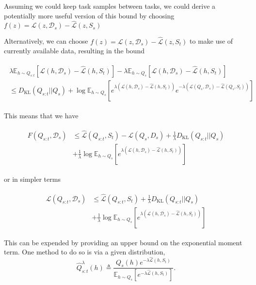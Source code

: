 \documentclass[letterpaper]{article}
\theoremstyle{definition}
\begin{document}
Assuming we could keep task samples between tasks, we could derive a potentially more useful version of this bound by choosing $f(z)=\mathcal{L}(z,\mathcal{D}_s)-\hat{\mathcal{L}}(z,S_s)$ %

Alternatively, we can choose $f(z)=\mathcal{L}(z,\mathcal{D}_s)-\hat{\mathcal{L}}(z,S_t)$ to make use of currently available data, resulting in the bound 


\begin{align*}
\begin{split}
\lambda\mathbb{E}_{h\sim Q_{s:t}}\left [\mathcal{L}(h,\mathcal{D}_s)-\hat{\mathcal{L}}(h,S_t) \right ] - \lambda\mathbb{E}_{h\sim Q_{s}}\left [\mathcal{L}(h,\mathcal{D}_s)-\hat{\mathcal{L}}(h,S_t) \right ] \\
\leq D_{\mathrm{KL}}(Q_{s:t}||Q_{s})+\log\mathbb{E}_{h\sim Q_{s}}\left [e^{\lambda(\mathcal{L}(h,\mathcal{D}_s)-\hat{\mathcal{L}}(h,S_t))}e^{-\lambda(\mathcal{L}(Q_s,\mathcal{D}_s)-\hat{\mathcal{L}}(Q_s,S_t))} \right ]
\end{split}
\end{align*}

This means that we have

\begin{align} \label{eq:forget-base}
\begin{split}
F(Q_{s:t},\mathcal{D}_s) &\leq \hat{\mathcal{L}}(Q_{s:t}, S_t) - \mathcal{L}(Q_{s}, D_s) + \frac{1}{\lambda} D_{\mathrm{KL}}(Q_{s:t}||Q_{s})\\
&+\frac{1}{\lambda}\log\mathbb{E}_{h\sim Q_{s}}\left [e^{\lambda(\mathcal{L}(h,\mathcal{D}_s)-\hat{\mathcal{L}}(h,S_t))} \right ]
\end{split}
\end{align}

or in simpler terms 

\begin{align} \label{eq:forget-base2}
\begin{split}
\mathcal{L}(Q_{s:t}, \mathcal{D}_s) &\leq \hat{\mathcal{L}}(Q_{s:t}, S_t) + \frac{1}{\lambda} D_{\mathrm{KL}}(Q_{s:t}||Q_{s})\\
&+\frac{1}{\lambda}\log\mathbb{E}_{h\sim Q_{s}}\left [e^{\lambda(\mathcal{L}(h,\mathcal{D}_s)-\hat{\mathcal{L}}(h,S_t))} \right ]
\end{split}
\end{align}

This can be expended by providing an upper bound on the exponential moment term.
One method to do so is via a given distribution, $$\hat{Q}_{s:t}^{\lambda}(h)\triangleq\frac{Q_s(h)e^{-\lambda\hat{\mathcal{L}}(h,S_t)}}{\mathbb{E}_{h\sim Q_s}\left [e^{-\lambda\hat{\mathcal{L}}(h,S_t)} \right ]}.$$
\end{document}
